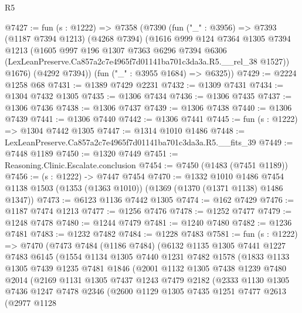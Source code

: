 \begin{lexlean}{R5}
\begin{coremodule}
@7427 := fun (s : @1222) =>
  @7358
    (@7390
      (fun ("_" : @3956) =>
      @7393
        (@1187 @7394 @1213)
        (@4268 @7394)
        (@1616
          @999
          @124
          @7364
          @1305
          @7394
          @1213
          (@1605
            @997
            @196
            @1307
            @7363
            @6296
            @7394
            @6306
            (LexLeanPreserve.Ca857a2c7e4965f7d01141ba701c3da3a.R5.__rel_38 @1527))
          @1676)
        (@4292 @7394))
      (fun ("_" : @3955 @1684) => @6325))
@7429 := @2224 @1258 @68
@7431 := @1389 @7429 @2231
@7432 := @1309 @7431
@7434 := @1304 @7432 @1305
@7435 := @1306 @7434
@7436 := @1306 @7435
@7437 := @1306 @7436
@7438 := @1306 @7437
@7439 := @1306 @7438
@7440 := @1306 @7439
@7441 := @1306 @7440
@7442 := @1306 @7441
@7445 := fun (s : @1222) => @1304 @7442 @1305
@7447 := @1314 @1010 @1486
@7448 := LexLeanPreserve.Ca857a2c7e4965f7d01141ba701c3da3a.R5.__fits_39
@7449 := @7448 @1189
@7450 := @1320 @7449
@7451 := Reasoning.Clinic.Escalate.conclusion
@7454 := @7450 (@1483 (@7451 @1189))
@7456 := (s : @1222) -> @7447 @7454
@7470 := @1332
    @1010
    @1486
    @7454
    @1138
    @1503
    (@1353 (@1363 @1010))
    (@1369 (@1370 (@1371 @1138) @1486 @1347))
@7473 := @6123 @1136 @7442 @1305
@7474 := @162 @7429
@7476 := @1187 @7474 @1213
@7477 := @1256 @7476
@7478 := @1252 @7477
@7479 := @1248 @7478
@7480 := @1244 @7479
@7481 := @1240 @7480
@7482 := @1236 @7481
@7483 := @1232 @7482
@7484 := @1228 @7483
@7581 := fun (s : @1222) =>
  @7470
    (@7473
      @7484
      (@1186 @7484)
      (@6132
        @1135
        @1305
        @7441
        @1227
        @7483
        @6145
        (@1554
          @1134
          @1305
          @7440
          @1231
          @7482
          @1578
          (@1833
            @1133
            @1305
            @7439
            @1235
            @7481
            @1846
            (@2001
              @1132
              @1305
              @7438
              @1239
              @7480
              @2014
              (@2169
                @1131
                @1305
                @7437
                @1243
                @7479
                @2182
                (@2333
                  @1130
                  @1305
                  @7436
                  @1247
                  @7478
                  @2346
                  (@2600
                    @1129
                    @1305
                    @7435
                    @1251
                    @7477
                    @2613
                    (@2977
                      @1128

\end{coremodule}
\end{lexlean}
